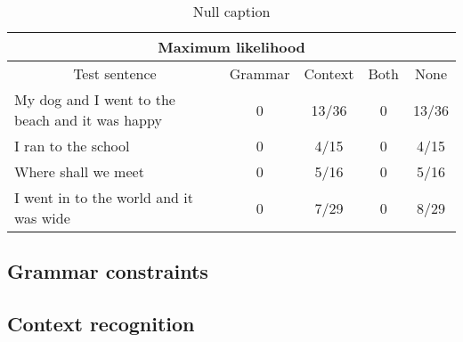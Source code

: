 \begin{table}[ht]
{\footnotesize
\begin{tabular}{ |p{}|c|c|c|c| }
	\hline
	\multicolumn{5}{|c|}{Maximum likelihood} \\
	\hline
	\multicolumn{1}{|c|}{Test sentence} & Grammar & Context & Both & None \\
	\hline
	My dog and I went to the beach and it was happy & 0 & 13/36 & 0 &13/36 \\
	\hline
	I ran to the school & 0 & 4/15 & 0 & 4/15 \\
	\hline
	Where shall we meet & 0 & 5/16 & 0 & 5/16 \\
	\hline
	I went in to the world and it was wide & 0 & 7/29 & 0 & 8/29 \\
	\hline
\end{tabular}
}



\caption{Null caption}
\end{table}
\vspace{1em}
\lipsum[1]
\subsection{Grammar constraints}
\lipsum[2-3]
\subsection{Context recognition}
\lipsum[2-3]